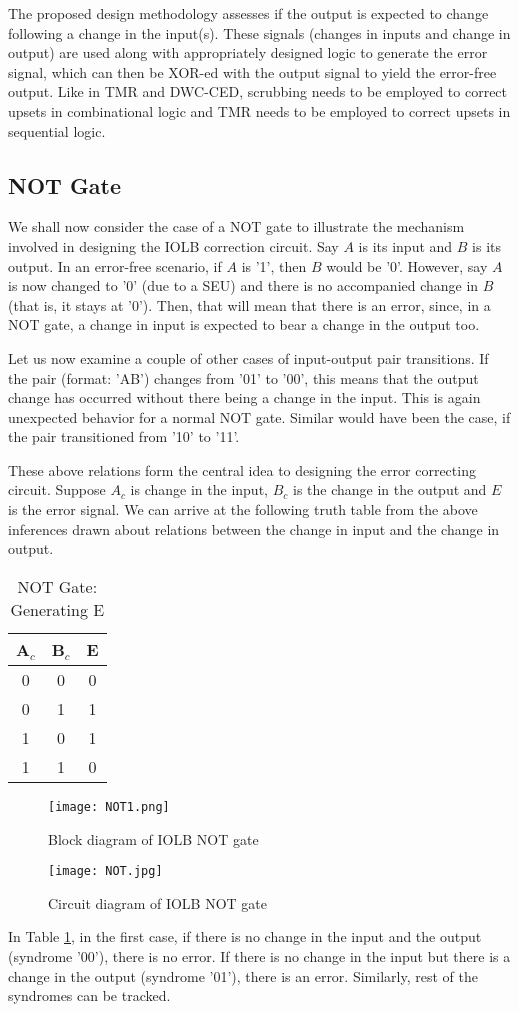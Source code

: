 \documentclass[10pt,journal,cspaper,compsoc]{IEEEtran}
\begin{document}
The proposed design methodology assesses if the output is expected to change following a change in the input(s). These signals (changes in inputs and change in output) are used along with appropriately designed logic to generate the error signal, which can then be XOR-ed with the output signal to yield the error-free output. Like in TMR and DWC-CED, scrubbing needs to be employed to correct upsets in combinational logic and TMR needs to be employed to correct upsets in sequential logic.
\subsection{NOT Gate}
We shall now consider the case of a NOT gate to illustrate the mechanism involved in designing the IOLB correction circuit. Say $A$ is its input and $B$ is its output. In an error-free scenario, if $A$ is '1', then $B$ would be '0'. However, say $A$ is now changed to '0' (due to a SEU)  and there is no accompanied change in $B$ (that is, it stays at '0'). Then, that will mean that there is an error, since, in a NOT gate, a change in input is expected to bear a change in the output too.

Let us now examine a couple of other cases of input-output pair transitions. If the pair (format: 'AB') changes from '01' to '00', this means that the output change has occurred without there being a change in the input. This is again unexpected behavior for a normal NOT gate. Similar would have been the case, if the pair transitioned from '10' to '11'.

These above relations form the central idea to designing the error correcting circuit. Suppose $A_{c}$ is change in the input, $B_{c}$ is the change in the output and $E$ is the error signal. We can arrive at the following truth table from the above inferences drawn about relations between the change in input and the change in output.
\begin{table}[t]
\caption{NOT Gate: Generating E} \centering \begin{tabular}{|c| c| c|} \hline
A$_{c}$ & B$_{c}$ & E  \\ [1ex] \hline 0 & 0 & 0 \\ 0 & 1 & 1 \\
1 & 0 & 1 \\
1 & 1 & 0 \\[1ex] \hline \end{tabular}
\label{tab1} \end{table}
\begin{figure}[t]
  \caption{Block diagram of IOLB NOT gate }\label{fig7}
  \centering
       \texttt{[image: NOT1.png]}
\end{figure}
\begin{figure}[t]
  \caption{Circuit diagram of IOLB NOT gate }\label{fig8}
  \centering
       \texttt{[image: NOT.jpg]}
\end{figure}
       In Table \ref{tab1}, in the first case, if there is no change in the input and the output (syndrome '00'), there is no error. If there is no change in the input but there is a change in the output (syndrome '01'), there is an error. Similarly, rest of the syndromes can be tracked.
\end{document}
